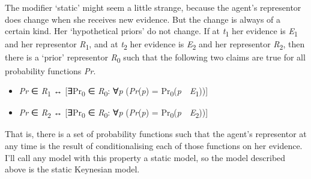 \documentclass[
  10pt,
  letterpaper,
  DIV=11,
  numbers=noendperiod,
  twoside]{scrartcl}
\providecommand{\tightlist}{%
  \setlength{\itemsep}{0pt}\setlength{\parskip}{0pt}}\usepackage{longtable,booktabs,array}
\begin{document}
The modifier `static' might seem a little strange, because the agent's
representor does change when she receives new evidence. But the change
is always of a certain kind. Her `hypothetical priors' do not change. If
at \emph{t}\textsubscript{1} her evidence is \emph{E}\textsubscript{1}
and her representor \emph{R}\textsubscript{1}, and at
\emph{t}\textsubscript{2} her evidence is \emph{E}\textsubscript{2} and
her representor \emph{R}\textsubscript{2}, then there is a `prior'
representor \emph{R}\textsubscript{0} such that the following two claims
are true for all probability functions \emph{Pr}.

\begin{itemize}
\tightlist
\item
  \emph{Pr} ∈ \emph{R}\textsubscript{1} ↔ {[}∃Pr\textsubscript{0} ∈
  \emph{R}\textsubscript{0}: ∀\emph{p} (\emph{Pr}(\emph{p}) =
  Pr\textsubscript{0}(\emph{p}~\textbar~\emph{E}\textsubscript{1})){]}
\item
  \emph{Pr} ∈ \emph{R}\textsubscript{2} ↔ {[}∃Pr\textsubscript{0} ∈
  \emph{R}\textsubscript{0}: ∀\emph{p} (\emph{Pr}(\emph{p}) =
  Pr\textsubscript{0}(\emph{p}~\textbar~\emph{E}\textsubscript{2})){]}
\end{itemize}

That is, there is a set of probability functions such that the agent's
representor at any time is the result of conditionalising each of those
functions on her evidence. I'll call any model with this property a
static model, so the model described above is the static Keynesian
model.
\end{document}
